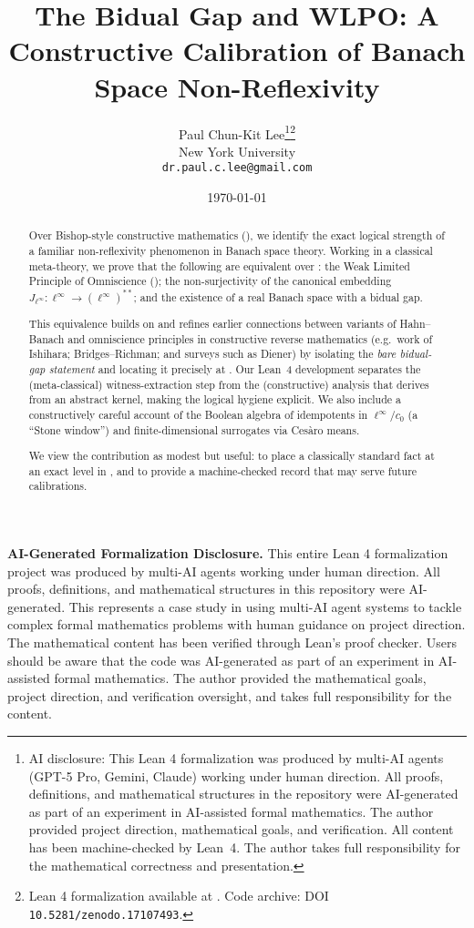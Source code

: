 \documentclass[11pt]{article}
\title{The Bidual Gap and WLPO: A Constructive Calibration of Banach Space Non-Reflexivity}
\author{Paul Chun-Kit Lee\thanks{AI disclosure:
This Lean 4 formalization was produced by multi-AI agents (GPT-5 Pro, Gemini, Claude) working under human direction. All proofs, definitions, and mathematical structures in the repository were AI-generated as part of an experiment in AI-assisted formal mathematics. The author provided project direction, mathematical goals, and verification. All content has been machine-checked by Lean~4. The author takes full responsibility for the mathematical correctness and presentation.}\thanks{Lean 4 formalization available at \leanRepo. Code archive: DOI \texttt{10.5281/zenodo.17107493}.} \\ 
New York University \\ 
\texttt{dr.paul.c.lee@gmail.com}}
\date{\today}
\newcommand{\WLPO}{\mathrm{WLPO}}
\newcommand{\BISH}{\mathrm{BISH}}
\newcommand{\CRM}{\mathrm{CRM}}
\begin{document}
\begin{abstract}
Over Bishop-style constructive mathematics (\BISH), we identify the exact logical strength of a familiar non-reflexivity phenomenon in Banach space theory. Working in a classical meta-theory, we prove that the following are equivalent over \BISH: the Weak Limited Principle of Omniscience (\WLPO); the non-surjectivity of the canonical embedding $J_{\ell^\infty}:\ell^\infty\to(\ell^\infty)^{**}$; and the existence of a real Banach space with a bidual gap. 

This equivalence builds on and refines earlier connections between variants of Hahn--Banach and omniscience principles in constructive reverse mathematics (e.g.\ work of Ishihara; Bridges--Richman; and surveys such as Diener) by isolating the \emph{bare bidual-gap statement} and locating it precisely at \WLPO. Our Lean~4 development separates the (meta-classical) witness-extraction step from the (constructive) analysis that derives \WLPO from an abstract kernel, making the logical hygiene explicit. We also include a constructively careful account of the Boolean algebra of idempotents in $\ell^\infty/c_0$ (a ``Stone window'') and finite-dimensional surrogates via Ces\`{a}ro means. 

We view the contribution as modest but useful: to place a classically standard fact at an exact level in \CRM, and to provide a machine-checked record that may serve future calibrations.
\end{abstract}

\maketitle

\begin{mdframed}[backgroundcolor=gray!08, linewidth=0.4pt]
\noindent\textbf{AI-Generated Formalization Disclosure.}
This entire Lean 4 formalization project was produced by multi-AI agents working under human direction. All proofs, definitions, and mathematical structures in this repository were AI-generated. This represents a case study in using multi-AI agent systems to tackle complex formal mathematics problems with human guidance on project direction. The mathematical content has been verified through Lean's proof checker. Users should be aware that the code was AI-generated as part of an experiment in AI-assisted formal mathematics. The author provided the mathematical goals, project direction, and verification oversight, and takes full responsibility for the content.
\end{mdframed}
\end{document}
